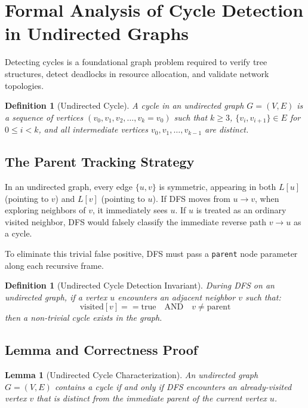 \documentclass[10pt,journal,compsoc,onecolumn]{IEEEtran}
\newtheorem{lemma}[theorem]{Lemma}
\newtheorem{definition}[theorem]{Definition}
\begin{document}
\section{Formal Analysis of Cycle Detection in Undirected Graphs}
\label{sec:undirected_cycle}

Detecting cycles is a foundational graph problem required to verify tree structures, detect deadlocks in resource allocation, and validate network topologies.

\begin{definition}[Undirected Cycle]
A cycle in an undirected graph $G = (V, E)$ is a sequence of vertices $(v_0, v_1, v_2, \dots, v_k = v_0)$ such that $k \ge 3$, $\{v_i, v_{i+1}\} \in E$ for $0 \le i < k$, and all intermediate vertices $v_0, v_1, \dots, v_{k-1}$ are distinct.
\end{definition}

\subsection{The Parent Tracking Strategy}

In an undirected graph, every edge $\{u, v\}$ is symmetric, appearing in both $L[u]$ (pointing to $v$) and $L[v]$ (pointing to $u$). If DFS moves from $u \to v$, when exploring neighbors of $v$, it immediately sees $u$. If $u$ is treated as an ordinary visited neighbor, DFS would falsely classify the immediate reverse path $v \to u$ as a cycle.

To eliminate this trivial false positive, DFS must pass a \texttt{parent} node parameter along each recursive frame.

\begin{definition}[Undirected Cycle Detection Invariant]
During DFS on an undirected graph, if a vertex $u$ encounters an adjacent neighbor $v$ such that:
\begin{equation}
\text{visited}[v] == \text{true} \quad \text{AND} \quad v \neq \text{parent}
\end{equation}
then a non-trivial cycle exists in the graph.
\end{definition}

\subsection{Lemma and Correctness Proof}

\begin{lemma}[Undirected Cycle Characterization]
\label{lem:undirected_cycle}
An undirected graph $G = (V, E)$ contains a cycle if and only if DFS encounters an already-visited vertex $v$ that is distinct from the immediate parent of the current vertex $u$.
\end{lemma}
\end{document}
